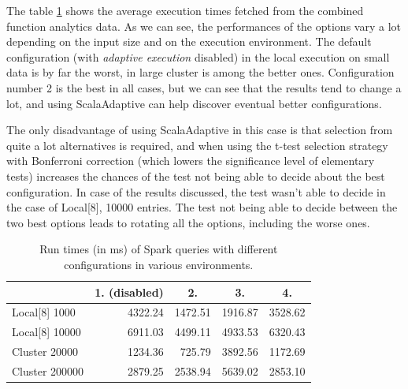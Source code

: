 The table \ref{tab:spark_adaptive_config_test} shows the average execution times fetched from the combined function analytics data. As we can see, the performances of the options vary a lot depending on the input size and on the execution environment. The default configuration (with \textit{adaptive execution} disabled) in the local execution on small data is by far the worst, in large cluster is among the better ones. Configuration number 2 is the best in all cases, but we can see that the results tend to change a lot, and using ScalaAdaptive can help discover eventual better configurations.

The only disadvantage of using ScalaAdaptive in this case is that selection from quite a lot alternatives is required, and when using the t-test selection strategy with Bonferroni correction (which lowers the significance level of elementary tests) increases the chances of the test not being able to decide about the best configuration. In case of the results discussed, the test wasn't able to decide in the case of Local[8], 10000 entries. The test not being able to decide between the two best options leads to rotating all the options, including the worse ones.

\begin{table}[h!]
	\centering
	\captionsetup{justification=centering,margin=0.5cm}
	\bgroup
	\def\arraystretch{1.5}%
	\begin{tabular}{|l|r|r|r|r|}
		\hline
		& \multicolumn{1}{c|}{\textbf{1. (disabled)}} & \multicolumn{1}{c|}{\textbf{2.}} & \multicolumn{1}{c|}{\textbf{3.}} & \multicolumn{1}{c|}{\textbf{4.}} \\ \hline
		Local{[}8{]} 1000  & 4322.24                                     & 1472.51                          & 1916.87                          & 3528.62                          \\ \hline
		Local{[}8{]} 10000 & 6911.03                                     & 4499.11                          & 4933.53                          & 6320.43                          \\ \hline
		Cluster 20000      & 1234.36                                     & 725.79                           & 3892.56                          & 1172.69                          \\ \hline
		Cluster 200000     & 2879.25                                     & 2538.94                          & 5639.02                          & 2853.10                          \\ \hline
	\end{tabular}
\egroup
\caption{Run times (in ms) of Spark queries with different configurations in various environments.}
\label{tab:spark_adaptive_config_test}
\end{table}

